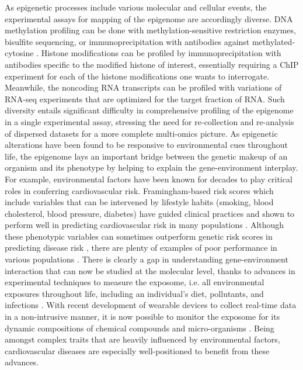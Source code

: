 \documentclass[letter]{bioinfo}
\begin{document}
	
	As epigenetic processes include various molecular and cellular events, the experimental assays for mapping of the epigenome are accordingly diverse. DNA methylation profiling can be done with methylation-sensitive restriction enzymes, bisulfite sequencing, or immunoprecipitation with antibodies against methylated-cytosine \citep{Bibikova:2010:Genomewide}. Histone modifications can be profiled by immunoprecipitation with antibodies specific to the modified histone of interest, essentially requiring a ChIP experiment for each of the histone modifications one wants to interrogate. Meanwhile, the noncoding RNA transcripts can be profiled with variations of RNA-seq experiments that are optimized for the target fraction of RNA. Such diversity entails significant difficulty in comprehensive profiling of the epigenome in a single experimental assay, stressing the need for re-collection and re-analysis of dispersed datasets for a more complete multi-omics picture. As epigenetic alterations have been found to be responsive to environmental cues throughout life, the epigenome lays an important bridge between the genetic makeup of an organism and its phenotype by helping to explain the gene-environment interplay.
	For example, environmental factors have been known for decades to play critical roles in conferring cardiovascular risk. Framingham-based risk scores \citep{Sheridan:2003:Framinghambased} which include variables that can be intervened by lifestyle habits (smoking, blood cholesterol, blood pressure, diabetes) have guided clinical practices \citep{British:1998:Joint} and shown to perform well in predicting cardiovascular risk in many populations \citep{Knuiman:1997:Prediction,Eichler:2007:Prediction}. Although these phenotypic variables can sometimes outperform genetic risk scores in predicting disease risk \citep{Talmud:2010:Utility}, there are plenty of examples of poor performance in various populations \citep{Eichler:2007:Prediction,Zomer:2014:Cardiovascular,DAgostino:2001:Validation,Empana:2003:Are}.
	There is clearly a gap in understanding gene-environment interaction that can now be studied at the molecular level, thanks to advances in experimental techniques to measure the exposome, i.e. all environmental exposures throughout life, including an individual's diet, pollutants, and infections \citep{Wild:2005:Complementing}. With recent development of wearable devices to collect real-time data in a non-intrusive manner, it is now possible to monitor the exposome for its dynamic compositions of chemical compounds and micro-organisms \citep{Warth:2017:ExposomeScale, Jiang:2018:Dynamic}. Being amongst complex traits that are heavily influenced by environmental factors, cardiovascular diseases are especially well-positioned to benefit from these advances.
	
\end{document}
